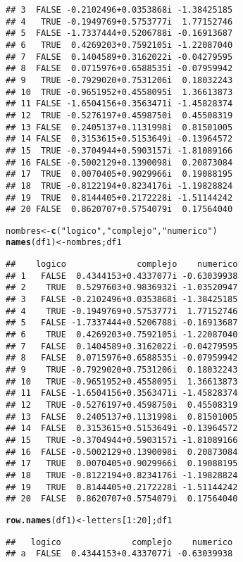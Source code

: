 \documentclass[10pt,a4paper]{article}\usepackage[]{graphicx}\usepackage[]{color}
\makeatletter
\newcommand{\hlnum}[1]{\textcolor[rgb]{0.686,0.059,0.569}{#1}}%
\newcommand{\hlstr}[1]{\textcolor[rgb]{0.192,0.494,0.8}{#1}}%
\newcommand{\hlopt}[1]{\textcolor[rgb]{0,0,0}{#1}}%
\newcommand{\hlstd}[1]{\textcolor[rgb]{0.345,0.345,0.345}{#1}}%
\newcommand{\hlkwb}[1]{\textcolor[rgb]{0.69,0.353,0.396}{#1}}%
\newcommand{\hlkwd}[1]{\textcolor[rgb]{0.737,0.353,0.396}{\textbf{#1}}}%
\newenvironment{kframe}{%
 \def\at@end@of@kframe{}%
 \ifinner\ifhmode%
  \def\at@end@of@kframe{\end{minipage}}%
  \begin{minipage}{\columnwidth}%
 \fi\fi%
 \def\FrameCommand##1{\hskip\@totalleftmargin \hskip-\fboxsep
 \colorbox{shadecolor}{##1}\hskip-\fboxsep
     \hskip-\linewidth \hskip-\@totalleftmargin \hskip\columnwidth}%
 \MakeFramed {\advance\hsize-\width
   \@totalleftmargin\z@ \linewidth\hsize
   \@setminipage}}%
 {\par\unskip\endMakeFramed%
 \at@end@of@kframe}
\newenvironment{knitrout}{}{} %
\makeatother
\begin{document}
\begin{knitrout}
\begin{kframe}
\begin{verbatim}
## 3  FALSE -0.2102496+0.0353868i -1.38425185
## 4   TRUE -0.1949769+0.5753777i  1.77152746
## 5  FALSE -1.7337444+0.5206788i -0.16913687
## 6   TRUE  0.4269203+0.7592105i -1.22087040
## 7  FALSE  0.1404589+0.3162022i -0.04279595
## 8  FALSE  0.0715976+0.6588535i -0.07959942
## 9   TRUE -0.7929020+0.7531206i  0.18032243
## 10  TRUE -0.9651952+0.4558095i  1.36613873
## 11 FALSE -1.6504156+0.3563471i -1.45828374
## 12  TRUE -0.5276197+0.4598750i  0.45508319
## 13 FALSE  0.2405137+0.1131998i  0.81501005
## 14 FALSE  0.3153615+0.5153649i -0.13964572
## 15  TRUE -0.3704944+0.5903157i -1.81089166
## 16 FALSE -0.5002129+0.1390098i  0.20873084
## 17  TRUE  0.0070405+0.9029966i  0.19088195
## 18  TRUE -0.8122194+0.8234176i -1.19828824
## 19  TRUE  0.8144405+0.2172228i -1.51144242
## 20 FALSE  0.8620707+0.5754079i  0.17564040
\end{verbatim}
\begin{alltt}
\hlstd{nombres} \hlkwb{<-} \hlkwd{c}\hlstd{(}\hlstr{"logico"}\hlstd{,} \hlstr{"complejo"}\hlstd{,} \hlstr{"numerico"}\hlstd{)}
\hlkwd{names}\hlstd{(df1)} \hlkwb{<-} \hlstd{nombres; df1}
\end{alltt}
\begin{verbatim}
##    logico              complejo    numerico
## 1   FALSE  0.4344153+0.4337077i -0.63039938
## 2    TRUE  0.5297603+0.9836932i -1.03520947
## 3   FALSE -0.2102496+0.0353868i -1.38425185
## 4    TRUE -0.1949769+0.5753777i  1.77152746
## 5   FALSE -1.7337444+0.5206788i -0.16913687
## 6    TRUE  0.4269203+0.7592105i -1.22087040
## 7   FALSE  0.1404589+0.3162022i -0.04279595
## 8   FALSE  0.0715976+0.6588535i -0.07959942
## 9    TRUE -0.7929020+0.7531206i  0.18032243
## 10   TRUE -0.9651952+0.4558095i  1.36613873
## 11  FALSE -1.6504156+0.3563471i -1.45828374
## 12   TRUE -0.5276197+0.4598750i  0.45508319
## 13  FALSE  0.2405137+0.1131998i  0.81501005
## 14  FALSE  0.3153615+0.5153649i -0.13964572
## 15   TRUE -0.3704944+0.5903157i -1.81089166
## 16  FALSE -0.5002129+0.1390098i  0.20873084
## 17   TRUE  0.0070405+0.9029966i  0.19088195
## 18   TRUE -0.8122194+0.8234176i -1.19828824
## 19   TRUE  0.8144405+0.2172228i -1.51144242
## 20  FALSE  0.8620707+0.5754079i  0.17564040
\end{verbatim}
\begin{alltt}
\hlkwd{row.names}\hlstd{(df1)} \hlkwb{<-} \hlstd{letters[}\hlnum{1}\hlopt{:}\hlnum{20}\hlstd{]; df1}
\end{alltt}
\begin{verbatim}
##   logico              complejo    numerico
## a  FALSE  0.4344153+0.4337077i -0.63039938

\end{verbatim}
\end{kframe}
\end{knitrout}
\end{document}
